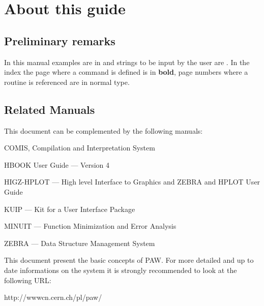 \newpage
 
\setcounter{page}{1}
 
\chapter*{About this guide}
 
\section*{Preliminary remarks}
 
In this manual
examples are in  and strings to be input by the user
are .
In the index the page where a command is defined is in {\bf bold},
page numbers where a routine is referenced are in normal type.
 

\section*{Related Manuals}
 
This document can be complemented by the following manuals:
 
\begin{UL}
\item COMIS, Compilation and Interpretation System~\cite{bib-COMIS}
\item HBOOK User Guide --- Version 4~\cite{bib-HBOOK}
\item HIGZ-HPLOT --- High level Interface to Graphics and ZEBRA and
                 HPLOT User Guide~\cite{bib-HIGZHPLOT}
\item KUIP --- Kit for a User Interface Package~\cite{bib-KUIP}
\item MINUIT --- Function Minimization and Error Analysis~\cite{bib-MINUIT}
\item ZEBRA --- Data Structure Management System~\cite{bib-ZEBRA}
\end{UL}
 
This document present the basic concepts of PAW. For more detailed and
up to date informations on the system it is strongly recommended to
look at the following URL:

\begin{center}\ttfamily
http://wwwcn.cern.ch/pl/paw/
\end{center}

